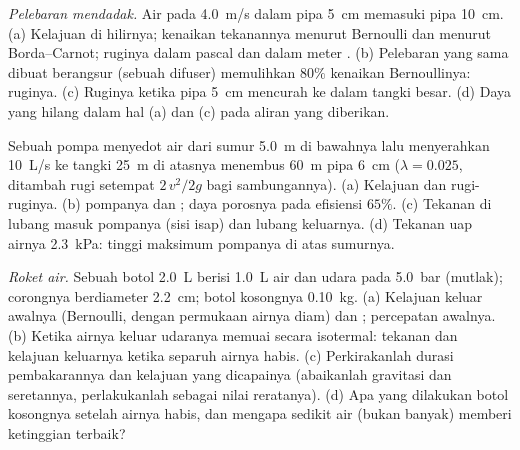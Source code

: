 \begin{exercise}[$\star\star$]\label{exo:b2:flow-balances:8}
\emph{Pelebaran mendadak.} Air pada \qty{4.0}{m/s} dalam pipa \qty{5}{cm} memasuki
pipa \qty{10}{cm}. (a) Kelajuan di hilirnya; kenaikan tekanannya menurut
Bernoulli dan menurut Borda--Carnot; ruginya dalam pascal dan dalam meter
. (b) Pelebaran yang sama dibuat berangsur (sebuah difuser) memulihkan $80\%$
kenaikan Bernoullinya: ruginya. (c) Ruginya ketika pipa \qty{5}{cm} mencurah
ke dalam tangki besar. (d) Daya yang hilang dalam hal (a) dan (c) pada aliran yang diberikan.
\end{exercise}

\begin{exercise}[$\star\star$]\label{exo:b2:flow-balances:9}
Sebuah pompa menyedot air dari sumur \qty{5.0}{m} di bawahnya lalu menyerahkan
\qty{10}{L/s} ke tangki \qty{25}{m} di atasnya menembus \qty{60}{m} pipa \qty{6}{cm}
($\lambda = 0.025$, ditambah rugi setempat $2\,v^2/2g$ bagi sambungannya).
(a) Kelajuan dan rugi-ruginya. (b)  pompanya dan ; daya porosnya
pada efisiensi $65\%$. (c) Tekanan di lubang masuk pompanya (sisi isap) dan
lubang keluarnya. (d) Tekanan uap airnya \qty{2.3}{kPa}: tinggi maksimum
pompanya di atas sumurnya.
\end{exercise}

\begin{exercise}[$\star\star\star$]\label{exo:b2:flow-balances:10}
\emph{Roket air.} Sebuah botol \qty{2.0}{L} berisi \qty{1.0}{L} air dan
udara pada \qty{5.0}{bar} (mutlak); corongnya berdiameter \qty{2.2}{cm};
botol kosongnya \qty{0.10}{kg}. (a) Kelajuan keluar awalnya (Bernoulli, dengan permukaan
airnya diam) dan ; percepatan awalnya. (b) Ketika airnya keluar
udaranya memuai secara isotermal: tekanan dan kelajuan keluarnya ketika separuh
airnya habis. (c) Perkirakanlah durasi pembakarannya dan kelajuan yang dicapainya
(abaikanlah gravitasi dan seretannya, perlakukanlah  sebagai nilai reratanya). (d)
Apa yang dilakukan botol kosongnya setelah airnya habis, dan mengapa sedikit
air (bukan banyak) memberi ketinggian terbaik?
\end{exercise}

